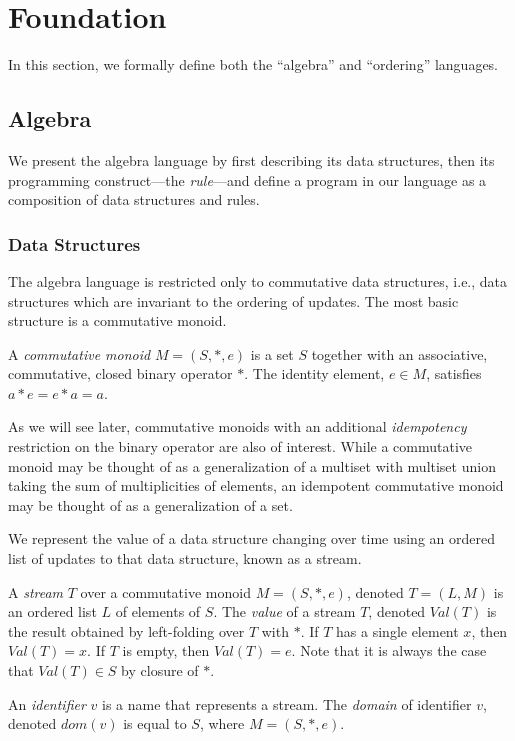 \section{Foundation}
\label{sec:foundation}

In this section, we formally define both the ``algebra'' and ``ordering'' languages.

\subsection{Algebra}

We present the algebra language by first describing its data structures, then its programming construct---the \emph{rule}---and define a program in our language as a composition of data structures and rules.

\subsubsection{Data Structures}

The algebra language is restricted only to commutative data structures, i.e., data structures which are invariant to the ordering of updates.  The most basic structure is a commutative monoid.

A {\em commutative monoid} $M = (S, *, e)$ is a set $S$ together with an associative, commutative, closed binary operator $*$.  The identity element, $e \in M$, satisfies $a*e = e*a = a$.

As we will see later, commutative monoids with an additional {\em idempotency} restriction on the binary operator are also of interest.  While a commutative monoid may be thought of as a generalization of a multiset with multiset union taking the sum of multiplicities of elements, an idempotent commutative monoid may be thought of as a generalization of a set.

We represent the value of a data structure changing over time using an ordered list of updates to that data structure, known as a stream.

A {\em stream} $T$ over a commutative monoid $M = (S, *, e)$, denoted $T = (L, M)$ is an ordered list $L$ of elements of $S$.  The {\em value} of a stream $T$, denoted $Val(T)$ is the result obtained by left-folding over $T$ with $*$.  If $T$ has a single element $x$, then $Val(T)=x$.  If $T$ is empty, then $Val(T)=e$.  Note that it is always the case that $Val(T) \in S$ by closure of $*$.

An {\em identifier} $v$ is a name that represents a stream.  The {\em domain} of identifier $v$, denoted $dom(v)$ is equal to $S$, where $M = (S, *, e)$.

